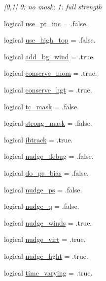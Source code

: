 \begin{DoxyCompactItemize}
\begin{DoxyCompactList}\small\item\em \mbox{[}0,1\mbox{]} 0\-: no mask; 1\-: full strength \end{DoxyCompactList}\item 
logical \hyperlink{classfv__nwp__nudge__mod_a1b4b58ec4a0172ebac02423ec390aec2}{use\-\_\-pt\-\_\-inc} = .false.
\item 
logical \hyperlink{classfv__nwp__nudge__mod_a37a4cc7b60012b2fdafe49c5befb8a84}{use\-\_\-high\-\_\-top} = .false.
\item 
logical \hyperlink{classfv__nwp__nudge__mod_a42e7ca1641769656215dab0c288e12a5}{add\-\_\-bg\-\_\-wind} = .true.
\item 
logical \hyperlink{classfv__nwp__nudge__mod_adb1086d378b3e7629b60b973f777e591}{conserve\-\_\-mom} = .true.
\item 
logical \hyperlink{classfv__nwp__nudge__mod_aa9d79a7ef439011ae3c43ebe64d5262d}{conserve\-\_\-hgt} = .true.
\item 
logical \hyperlink{classfv__nwp__nudge__mod_a091b1c329569ecb6a515ebeb3a9050c6}{tc\-\_\-mask} = .false.
\item 
logical \hyperlink{classfv__nwp__nudge__mod_a8514b5b22545a48edbde79b6cc213a2b}{strong\-\_\-mask} = .false.
\item 
logical \hyperlink{classfv__nwp__nudge__mod_a095af635f02f1f236a662ea553ed82ed}{ibtrack} = .true.
\item 
logical \hyperlink{classfv__nwp__nudge__mod_aa949ba1a2ce2ca23017b0da8a43f6c53}{nudge\-\_\-debug} = .false.
\item 
logical \hyperlink{classfv__nwp__nudge__mod_a0c85e97c2aecbe6ce8692709f34ab99d}{do\-\_\-ps\-\_\-bias} = .false.
\item 
logical \hyperlink{classfv__nwp__nudge__mod_acbab7a0c866d541bac35151394b129a5}{nudge\-\_\-ps} = .false.
\item 
logical \hyperlink{classfv__nwp__nudge__mod_ae3b2433d7487d03ec653e06c3df92977}{nudge\-\_\-q} = .false.
\item 
logical \hyperlink{classfv__nwp__nudge__mod_a5d9c6b2ff22b4d521f81880326ce0bdc}{nudge\-\_\-winds} = .true.
\item 
logical \hyperlink{classfv__nwp__nudge__mod_a969e6940a34f9a4a3f31606aaaef7bc6}{nudge\-\_\-virt} = .true.
\item 
logical \hyperlink{classfv__nwp__nudge__mod_a6e98d55e79bcefff8ef5c6db06c5aa6a}{nudge\-\_\-hght} = .true.
\item 
logical \hyperlink{classfv__nwp__nudge__mod_a798deef0b988b1711210e1bc67e44551}{time\-\_\-varying} = .true.

\end{DoxyCompactItemize}
